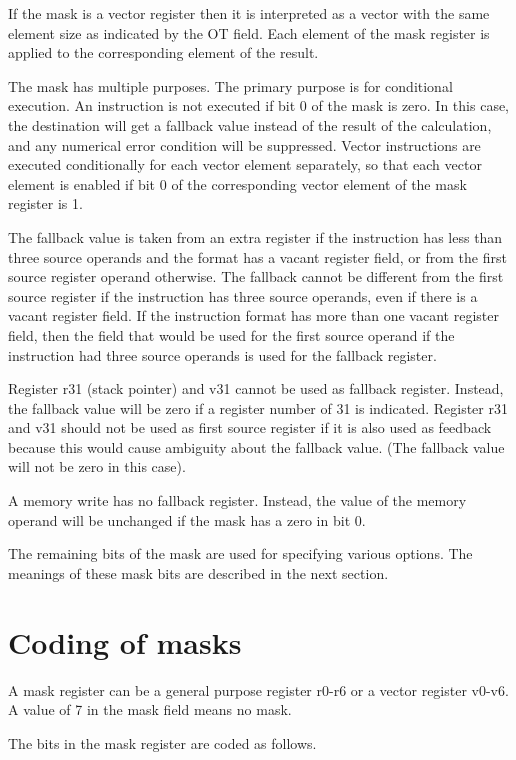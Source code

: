 \documentclass[forwardcom.tex]{subfiles}
\begin{document}
If the mask is a vector register then it is interpreted as a vector with the same element size as indicated by the OT field. Each element of the mask register is applied to the corresponding element of the result.
\vv

The mask has multiple purposes. The primary purpose is for conditional execution. An instruction is not executed if bit 0 of the mask is zero. In this case, the destination will get a fallback value instead of the result of the calculation, and any numerical error condition will be suppressed. Vector instructions are executed conditionally for each vector element separately, so that each vector element is enabled if bit 0 of the corresponding vector element of the mask register is 1.
\vv

The fallback value is taken from an extra register if the instruction has less than three source operands and the format has a vacant register field, or from the first source register operand otherwise. The fallback cannot be different from the first source register if the instruction has three source operands, even if there is a vacant register field. 
If the instruction format has more than one vacant register field, then the field that would be used for the first source operand if the instruction had three source operands is used for the fallback register.
\vv

Register r31 (stack pointer) and v31 cannot be used as fallback register. Instead, the fallback value will be zero if a register number of 31 is indicated. 
Register r31 and v31 should not be used as first source register if it is also used as feedback because this would cause ambiguity about the fallback value. (The fallback value will not be zero in this case).
\vv

A memory write has no fallback register. Instead, the value of the memory operand will be unchanged if the mask has a zero in bit 0.
\vv

The remaining bits of the mask are used for specifying various options.
The meanings of these mask bits are described in the next section.

\section{Coding of masks}
A mask register can be a general purpose register r0-r6 or a vector register v0-v6. A value of 7 in the mask field means no mask.
\vv

The bits in the mask register are coded as follows.
\end{document}

